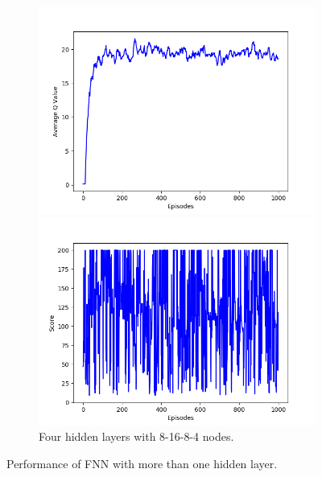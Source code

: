 \documentclass{article}
\begin{document}
\begin{figure}[!htbp]
  \begin{subfigure}{\textwidth}
    \begin{minipage}{0.49\textwidth}
      \centering
      \includegraphics[scale=0.45]{../experiments/nn_size_8_16_8_4/qvalues.png}
    \end{minipage}
    \begin{minipage}{0.49\textwidth}
      \centering
      \includegraphics[scale=0.45]{../experiments/nn_size_8_16_8_4/scores.png}
    \end{minipage}
    \caption{Four hidden layers with 8-16-8-4 nodes.}
  \end{subfigure}%
  \caption{Performance of FNN with more than one hidden layer.}
  \label{multi layers FNN}
\end{figure}
\end{document}

